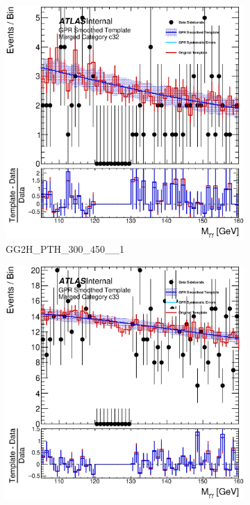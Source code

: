 \begin{figure}
\begin{center}
\begin{subfigure}[T]{0.49\linewidth}
	\includegraphics[width=\linewidth]{figures/background/gpr/coupCatTemplates/GPR_Smoothed_Plot_hmgg_c32.eps}
	\caption{GG2H\_PTH\_300\_450\_\_1}
\end{subfigure}
\begin{subfigure}[T]{0.49\linewidth}
	\centering
	\includegraphics[width=\linewidth]{figures/background/gpr/coupCatTemplates/GPR_Smoothed_Plot_hmgg_c33.eps}

\end{subfigure}
\end{center}
\end{figure}
